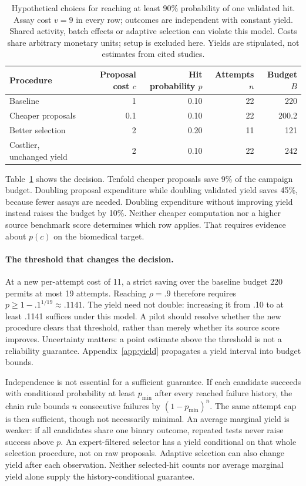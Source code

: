 \begin{table}[htbp]
\caption{Hypothetical choices for reaching at least 90\% probability of one validated hit. Assay cost $v=9$ in every row; outcomes are independent with constant yield. Shared activity, batch effects or adaptive selection can violate this model. Costs share arbitrary monetary units; setup is excluded here. Yields are stipulated, not estimates from cited studies.}
\label{tab:yield}
\centering\small
\begin{tabular}{lrrrr}
\toprule
Procedure & Proposal cost $c$ & Hit probability $p$ & Attempts $n$ & Budget $B$\\
\midrule
Baseline & 1 & 0.10 & 22 & 220\\
Cheaper proposals & 0.1 & 0.10 & 22 & 200.2\\
Better selection & 2 & 0.20 & 11 & 121\\
Costlier, unchanged yield & 2 & 0.10 & 22 & 242\\
\bottomrule
\end{tabular}
\end{table}

Table~\ref{tab:yield} shows the decision. Tenfold cheaper proposals save 9\% of the campaign budget. Doubling proposal expenditure while doubling validated yield saves 45\%, because fewer assays are needed. Doubling expenditure without improving yield instead raises the budget by 10\%. Neither cheaper computation nor a higher source benchmark score determines which row applies. That requires evidence about $p(c)$ on the biomedical target.

\paragraph{The threshold that changes the decision.}
At a new per-attempt cost of 11, a strict saving over the baseline budget 220 permits at most 19 attempts. Reaching $\rho=.9$ therefore requires $p\ge1-.1^{1/19}\approx.1141$. The yield need not double: increasing it from .10 to at least .1141 suffices under this model. A pilot should resolve whether the new procedure clears that threshold, rather than merely whether its source score improves. Uncertainty matters: a point estimate above the threshold is not a reliability guarantee. Appendix~\ref{app:yield} propagates a yield interval into budget bounds.


Independence is not essential for a sufficient guarantee. If each candidate succeeds with conditional probability at least $p_{\min}$ after every reached failure history, the chain rule bounds $n$ consecutive failures by $(1-p_{\min})^n$. The same attempt cap is then sufficient, though not necessarily minimal. An average marginal yield is weaker: if all candidates share one binary outcome, repeated tests never raise success above $p$. An expert-filtered selector has a yield conditional on that whole selection procedure, not on raw proposals. Adaptive selection can also change yield after each observation. Neither selected-hit counts nor average marginal yield alone supply the history-conditional guarantee.

